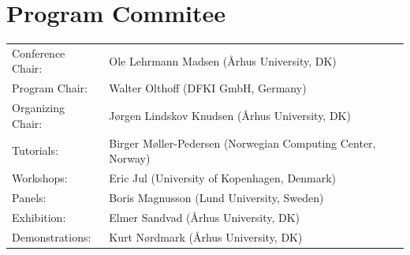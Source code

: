 \documentclass{llncs}
\begin{document}
\section*{Program Commitee}
\begin{tabular}{@{}p{5cm}@{}p{7.2cm}@{}}
Conference Chair:&Ole Lehrmann Madsen (\AA rhus University, DK)\\
Program Chair:   &Walter Olthoff (DFKI GmbH, Germany)\\
Organizing Chair:&J\o rgen Lindskov Knudsen (\AA rhus University, DK)\\
Tutorials:&Birger M\o ller-Pedersen\hfil\break
(Norwegian Computing Center, Norway)\\
Workshops:&Eric Jul (University of Kopenhagen, Denmark)\\
Panels:&Boris Magnusson (Lund University, Sweden)\\
Exhibition:&Elmer Sandvad (\AA rhus University, DK)\\
Demonstrations:&Kurt N\o rdmark (\AA rhus University, DK)
\end{tabular}
%
\end{document}
